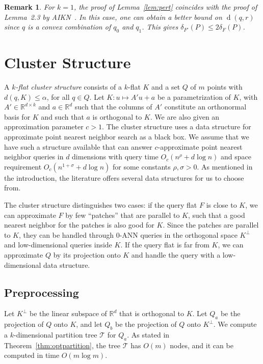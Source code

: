 \documentclass[a4paper,11pt]{paper}
\newcommand{\mathset}[1]{\ensuremath {\mathbb {#1}}}
\newcommand{\R}{\mathset{R}}
\DeclareMathOperator{\dist}{d}
\newtheorem{remark}[theorem]{Remark}
\begin{document}
\begin{remark}
  For $k=1$, the proof of Lemma~\ref{lem:pert} coincides with
  the proof of Lemma~2.3 by AIKN~\cite{AndoniInKrNg09}. In this
  case, one can obtain a
  better bound on $\dist(q, r)$ since $q$ is a convex combination
  of $q_0$ and $q_1$. This gives $\delta_{F'}(P)\leq 2 \delta_F(P)$.
\end{remark}

\section{Cluster Structure}
\label{sec:clusterstructure}
A \emph{$k$-flat cluster structure} consists of a $k$-flat
$K$ and a set $Q$ of $m$ points with
$d(q, K) \leq \alpha$, for all $q \in Q$.
Let $K: u \mapsto A'u + a$ be a parametrization of $K$, with
$A' \in \R^{d \times k}$ and $a \in \R^d$ such that the columns
of $A'$ constitute an orthonormal basis for $K$ and such that
$a$ is orthogonal to $K$.
We are also given an approximation parameter $c > 1$.
The cluster structure uses a data structure
for approximate point nearest neighbor search as a black box.
We assume that we have such a structure available that
can answer $c$-approximate point nearest neighbor queries
in $d$ dimensions with query time $O_c(n^{\rho} + d\log n)$
and space requirement $O_c(n^{1+\sigma} + d\log n)$ for
some constants $\rho, \sigma > 0$. As mentioned in the
introduction, the literature offers several data structures
for us to choose from.

The cluster structure distinguishes two cases:
if the query flat $F$ is close to $K$, we can approximate
$F$ by few ``patches'' that are parallel to $K$, such that
a good nearest neighbor for the patches is also
good for $K$. Since the patches are parallel to $K$, they
can be handled through $0$-ANN queries in the orthogonal
space $K^\perp$ and low-dimensional
queries inside $K$.
If the query flat is far from $K$, we can approximate $Q$
by its projection onto $K$ and handle the query with a
low-dimensional data structure.

\subsection{Preprocessing}

Let $K^\perp$ be the linear subspace of $\R^d$ that is orthogonal
to $K$. Let $Q_a$ be the projection of $Q$ onto $K$,
and let $Q_b$ be the projection of $Q$ onto $K^\perp$.
We compute a $k$-dimensional partition
tree $\mathcal{T}$ for $Q_a$.
As stated in Theorem~\ref{thm:optpartition}, the tree $\mathcal{T}$
has $O(m)$ nodes, and it can be computed in time $O(m \log m)$.
\end{document}

